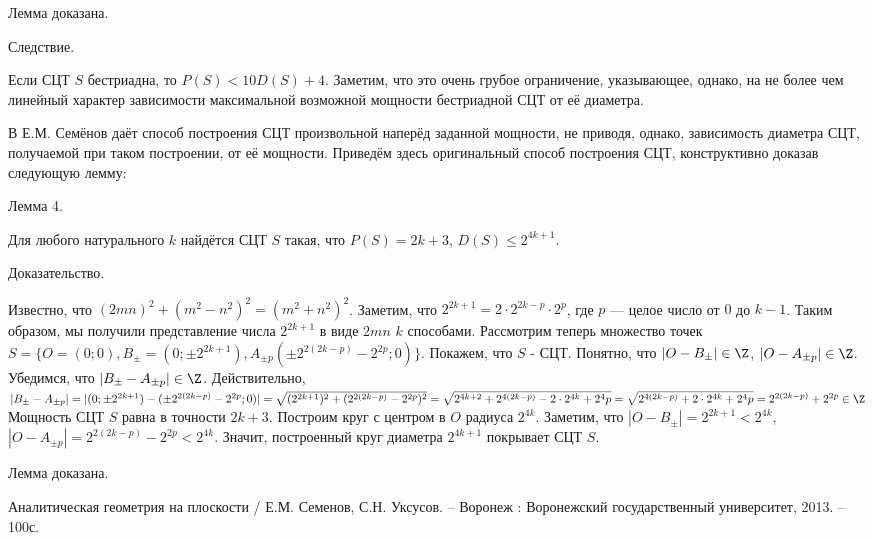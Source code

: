 \documentclass[a4paper,14pt]{article}
\begin{document}
Лемма доказана.

Следствие.

Если СЦТ $S$ бестриадна, то
$P(S) < 10 D(S)+4$.
Заметим, что это очень грубое ограничение, указывающее, однако, на не более чем линейный характер зависимости максимальной возможной мощности  бестриадной СЦТ от её диаметра.

В \cite{angem1kurs} Е.М. Семёнов даёт способ построения СЦТ произвольной наперёд заданной мощности, не приводя, однако, зависимость диаметра СЦТ, получаемой при таком построении, от её мощности.
Приведём здесь оригинальный способ построения СЦТ, конструктивно доказав следующую лемму:

Лемма 4.

Для любого натурального $k$ найдётся СЦТ $S$ такая, что $P(S)=2k+3$, $D(S)\leq 2^{4k+1}$.

Доказательство.

Известно, что $(2mn)^2+(m^2-n^2)^2=(m^2+n^2)^2$.
Заметим, что $2^{2k+1} = 2 \cdot 2^{2k-p} \cdot 2^p$, где $p$ --- целое число от $0$ до $k-1$.
Таким образом, мы получили представление числа $2^{2k+1}$ в виде $2mn$ $k$ способами.
Рассмотрим теперь множество точек $S=\{O=(0;0),B_\pm=(0;\pm 2^{2k+1}),A_{\pm p}(\pm 2^{2(2k-p)}-2^{2p};0)\}$.
Покажем, что $S$ - СЦТ.
Понятно, что $|O-B_\pm|\in\Z$, $|O-A_{\pm p}|\in\Z$.
Убедимся, что $|B_\pm-A_{\pm p}|\in\Z$.
Действительно, $|B_\pm-A_{\pm p}|=|(0;\pm 2^{2k+1}) - (\pm 2^{2(2k-p)}-2^{2p};0)| = \sqrt{(2^{2k+1})^2+(2^{2(2k-p)}-2^{2p})^2}=
\sqrt{2^{4k+2}+2^{4(2k-p)}-2\cdot 2^{4k}+2^4p}=\sqrt{2^{4(2k-p)}+2\cdot 2^{4k}+2^4p}=2^{2(2k-p)}+2^{2p}\in\Z$
Мощность СЦТ $S$ равна в точности $2k+3$.
Построим круг с центром в $O$ радиуса $2^{4k}$.
Заметим, что $|O-B_\pm|=2^{2k+1}<2^{4k}$, $|O-A_{\pm p}| = 2^{2(2k-p)}-2^{2p} < 2^{4k}$.
Значит, построенный круг диаметра $2^{4k+1}$ покрывает СЦТ $S$.

Лемма доказана.


\begin{thebibliography}{99}

 Аналитическая геометрия на плоскости / Е.М. Семенов, С.Н. Уксусов. – Воронеж : Воронежский государственный университет, 2013. – 100с.

\end{thebibliography}
\end{document}
